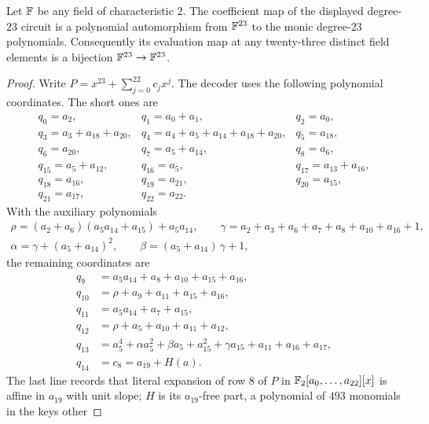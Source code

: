 \begin{lemma}
\label{lem:char2-degree23-inverse}
Let $\mathbb{F}$ be any field of characteristic $2$.  The coefficient map of the
displayed degree-$23$ circuit is a polynomial automorphism from $\mathbb{F}^{23}$ to
the monic degree-$23$ polynomials.  Consequently its evaluation map at any
twenty-three distinct field elements is a bijection $\mathbb{F}^{23}\to\mathbb{F}^{23}$.
\end{lemma}
\begin{proof}
Write $P=x^{23}+\sum_{j=0}^{22}c_jx^j$.  The decoder uses the following
polynomial coordinates.  The short ones are
\[
\begin{array}{lll}
q_0=a_2,&q_1=a_0+a_1,&q_2=a_0,\\
q_3=a_3+a_{18}+a_{20},&q_4=a_4+a_5+a_{14}+a_{18}+a_{20},&q_5=a_{18},\\
q_6=a_{20},&q_7=a_5+a_{14},&q_8=a_6,\\
q_{15}=a_5+a_{12},&q_{16}=a_5,&q_{17}=a_{13}+a_{16},\\
q_{18}=a_{16},&q_{19}=a_{21},&q_{20}=a_{15},\\
q_{21}=a_{17},&q_{22}=a_{22}.&
\end{array}                                                       \tag{A.35}\label{eq:char2-23-q-forward}
\]
With the auxiliary polynomials
\[
\begin{gathered}
 \rho=(a_2+a_6)(a_5a_{14}+a_{15})+a_5a_{14},\qquad
 \gamma=a_2+a_3+a_6+a_7+a_8+a_{10}+a_{16}+1,\\
 \alpha=\gamma+(a_5+a_{14})^2,\qquad
 \beta=(a_5+a_{14})\,\gamma+1,
\end{gathered}
\]
the remaining coordinates are
\[
\begin{aligned}
q_9&=a_5a_{14}+a_8+a_{10}+a_{15}+a_{16},\\
q_{10}&=\rho+a_9+a_{11}+a_{15}+a_{16},\\
q_{11}&=a_5a_{14}+a_7+a_{15},\\
q_{12}&=\rho+a_5+a_{10}+a_{11}+a_{12},\\
q_{13}&=a_5^4+\alpha a_5^2+\beta a_5+a_{15}^2+\gamma a_{15}+a_{11}+a_{16}+a_{17},\\
q_{14}&=c_8=a_{19}+H(a).
\end{aligned}                                                     \tag{A.36}\label{eq:char2-23-q-long}
\]
The last line records that literal expansion of row $8$ of $P$ in
$\mathbb{F}_2[a_0,\ldots,a_{22}][x]$ is affine in $a_{19}$ with unit slope; $H$ is
its $a_{19}$-free part, a polynomial of $493$ monomials in the keys other

\end{proof}

